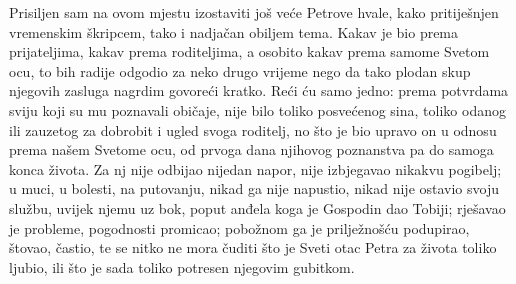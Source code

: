 \documentclass[a5paper,twoside]{article}
\begin{document}
\pend
\pstart
Prisiljen sam na ovom mjestu izostaviti još veće Petrove hvale, kako pritiješnjen vremenskim škripcem, tako i nadjačan obiljem tema.  Kakav je bio prema prijateljima, kakav prema roditeljima, a osobito kakav prema samome Svetom ocu, to bih radije odgodio za neko drugo vrijeme nego da tako plodan skup njegovih zasluga nagrdim govoreći kratko. Reći ću samo jedno: prema potvrdama sviju koji su mu poznavali običaje, nije bilo toliko posvećenog sina, toliko odanog ili zauzetog za dobrobit i ugled svoga roditelj, no što je bio upravo on u odnosu prema našem Svetome ocu, od prvoga dana njihovog poznanstva pa do samoga konca života. Za nj nije odbijao nijedan napor, nije izbjegavao nikakvu pogibelj; u muci, u bolesti, na putovanju, nikad ga nije napustio, nikad nije ostavio svoju službu, uvijek njemu uz bok, poput anđela koga je Gospodin dao Tobiji; rješavao je probleme, pogodnosti promicao; pobožnom ga je prilježnošću podupirao, štovao, častio, te se nitko ne mora čuditi što je Sveti otac Petra za života toliko ljubio, ili što je sada toliko potresen njegovim gubitkom.
\end{document}
